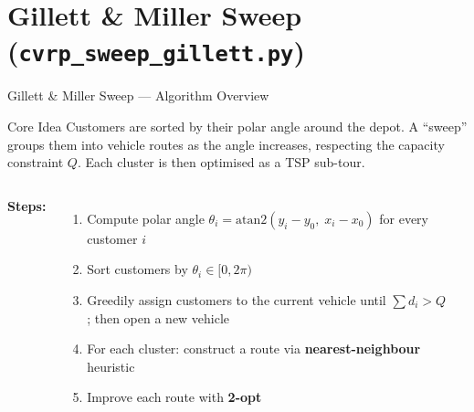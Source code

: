 \documentclass{beamer}
\begin{document}
%
%

\section{Gillett \& Miller Sweep (\texttt{cvrp\_sweep\_gillett.py})}

\begin{frame}{Gillett \& Miller Sweep — Algorithm Overview}

\begin{block}{Core Idea}
Customers are sorted by their polar angle around the depot.
A ``sweep'' groups them into vehicle routes as the angle increases,
respecting the capacity constraint $Q$.
Each cluster is then optimised as a TSP sub-tour.
\end{block}

\vspace{0.2em}

\begin{columns}[T]

\textbf{Steps:}
\begin{enumerate}\small
  \item Compute polar angle $\theta_i = \text{atan2}(y_i - y_0,\; x_i - x_0)$ for every customer $i$
  \item Sort customers by $\theta_i \in [0, 2\pi)$
  \item Greedily assign customers to the current vehicle until $\sum d_i > Q$; then open a new vehicle
  \item For each cluster: construct a route via \textbf{nearest-neighbour} heuristic
  \item Improve each route with \textbf{2-opt}
\end{enumerate}

\begin{center}
\end{center}
\end{columns}

\end{frame}
\end{document}
